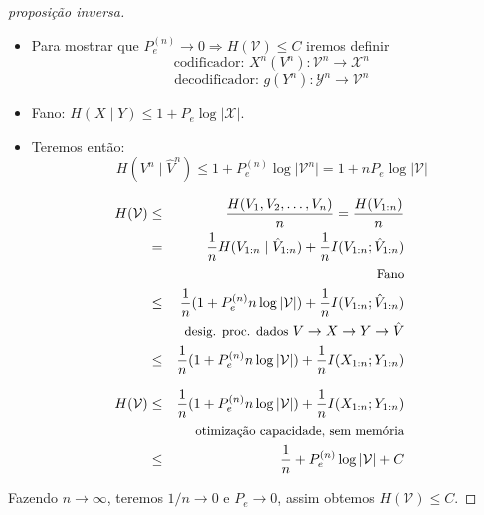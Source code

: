 \begin{frame}[allowframebreaks]
  \framebreak
  \begin{proof}[proposição inversa]
  \begin{itemize}
  \item Para mostrar que $P_e^{(n)} \rightarrow 0 \Rightarrow H(\mathcal{V}) \leq C$ iremos definir
	\begin{equation}
	\text{codificador: } X^n(V^n): \mathcal{V}^n \rightarrow \mathcal{X}^n
	\end{equation} 
        \begin{equation}
        \text{decodificador: } g(Y^n): \mathcal{Y}^n \rightarrow \mathcal{V}^n
        \end{equation} 
  \item Fano: $H(X\mid Y) \leq 1 + P_e \log \vert \mathcal{X} \vert$.
  \item Teremos então:
	\begin{equation}
	H(V^n \mid \hat{V}^n) \leq 1 + P_e^{(n)} \log \vert \mathcal{V}^n \vert = 1  + n P_e \log \vert \mathcal{V} \vert
	\end{equation}
  \end{itemize}

  \proofbreak

	\begin{eqnarray}	
	H(\mathcal{V}) &\leq& \frac{H(V_1, V_2, \ldots, V_n)}{n} = \frac{H(V_{1:n})}{n} \nonumber \\
		&=& \frac{1}{n} H(V_{1:n} \mid \hat{V}_{1:n}) + \frac{1}{n} I(V_{1:n};\hat{V}_{1:n}) \nonumber \\
		&& \text{\small Fano} \nonumber \\
		&\leq& \frac{1}{n} (1 +  P_e^{(n)} n \log \vert \mathcal{V} \vert) + \frac{1}{n} I(V_{1:n};\hat{V}_{1:n}) \nonumber \\
		&& \text{\small desig. proc. dados } V \rightarrow X \rightarrow Y \rightarrow \hat{V} \nonumber \\
		&\leq& \frac{1}{n} (1 +  P_e^{(n)} n \log \vert \mathcal{V} \vert) + \frac{1}{n} I(X_{1:n}; Y_{1:n}) 
	\end{eqnarray}

  \proofbreak

	\begin{eqnarray}        
        H(\mathcal{V}) &\leq& \frac{1}{n} (1 +  P_e^{(n)} n \log \vert \mathcal{V} \vert) + \frac{1}{n} I(X_{1:n}; Y_{1:n}) \nonumber \\
			&& \text{\small otimização capacidade, sem memória} \nonumber \\
			&\leq& \frac{1}{n} + P_e^{(n)} \log \vert \mathcal{V} \vert + C
	\end{eqnarray}

  Fazendo $n \rightarrow \infty$, teremos $1/n \rightarrow 0$ e $P_e \rightarrow 0$, assim obtemos $H(\mathcal{V}) \leq C$.
  \end{proof}


\end{frame}


